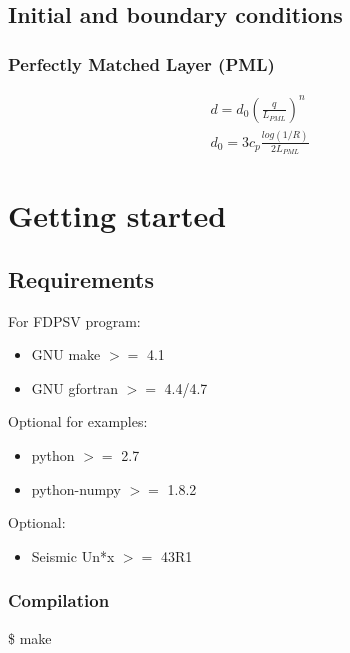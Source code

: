 \documentclass{gnulike}
\newcommand{\addbash}[1]{
	\begin{center}
	\colorbox{bashgray}{\begin{minipage}{0.9\textwidth}
  	\ttfamily \$ #1
\end{minipage}}
	\end{center}
}
\begin{document}
\section{Initial and boundary conditions}

\subsection{Perfectly Matched Layer (PML)}

\cite{berenger1994perfectly}

\begin{eqnarray}
\label{pml-damp}
d = d_{0} \left( \frac{q}{L_{PML}} \right) ^{n} \\
d_{0} = 3c_{p} \frac{log(1/R)}{2L_{PML}}
\end{eqnarray}

\chapter{Getting started}

\section{Requirements}

\noindent For FDPSV program:
\begin{itemize}
	\item GNU make $>=$ 4.1
	\item GNU gfortran $>=$ 4.4/4.7
\end{itemize}

\noindent Optional for examples:
\begin{itemize}
	\item python $>=$ 2.7
	\item python-numpy $>=$ 1.8.2
\end{itemize}

\noindent Optional:
\begin{itemize}
	\item Seismic Un*x $>=$ 43R1
\end{itemize}

\subsection{Compilation}
\addbash{make}
\end{document}
